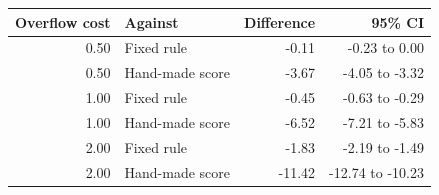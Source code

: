 \begin{tabular}{rlrr}
\toprule
Overflow cost & Against & Difference & 95\% CI \\
\midrule
0.50 & Fixed rule & -0.11 & -0.23 to 0.00 \\
0.50 & Hand-made score & -3.67 & -4.05 to -3.32 \\
1.00 & Fixed rule & -0.45 & -0.63 to -0.29 \\
1.00 & Hand-made score & -6.52 & -7.21 to -5.83 \\
2.00 & Fixed rule & -1.83 & -2.19 to -1.49 \\
2.00 & Hand-made score & -11.42 & -12.74 to -10.23 \\
\bottomrule
\end{tabular}
